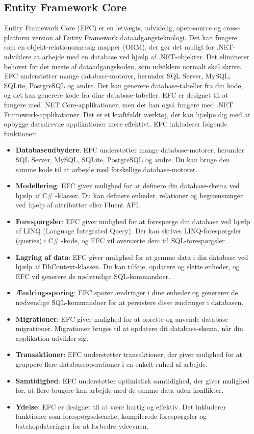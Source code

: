 \subsection{Entity Framework Core}
Entity Framework Core (EFC) er en letvægts, udvidelig, open-source og cross-platform version af Entity Framework dataadgangsteknologi.
Det kan fungere som en objekt-relationsmæssig mapper (ORM), der gør det muligt for .NET-udviklere at arbejde med en database ved hjælp af .NET-objekter.
Det eliminerer behovet for det meste af dataadgangskoden, som udviklere normalt skal skrive. EFC understøtter mange database-motorer, herunder SQL Server, MySQL, SQLite, PostgreSQL og andre.
Det kan generere database-tabeller fra din kode, og det kan generere kode fra dine database-tabeller.
EFC er designet til at fungere med .NET Core-applikationer, men det kan også fungere med .NET Framework-applikationer.
Det er et kraftfuldt værktøj, der kan hjælpe dig med at opbygge datadrevne applikationer mere effektivt. EFC inkluderer følgende funktioner:
\begin{itemize}
    \item \textbf{Databaseudbydere}: EFC understøtter mange database-motorer, herunder SQL Server, MySQL, SQLite, PostgreSQL og andre. Du kan bruge den samme kode til at arbejde med forskellige database-motorer.
    \item \textbf{Modellering}: EFC giver mulighed for at definere din database-skema ved hjælp af C\# -klasser. Du kan definere enheder, relationer og begrænsninger ved hjælp af attributter eller Fluent API.
    \item \textbf{Forespørgsler}: EFC giver mulighed for at forespørge din database ved hjælp af LINQ (Language Integrated Query). Der kan skrives LINQ-forespørgsler (queries) i C\# -kode, og EFC vil oversætte dem til SQL-forespørgsler.
    \item \textbf{Lagring af data}: EFC giver mulighed for at gemme data i din database ved hjælp af DbContext-klassen. Du kan tilføje, opdatere og slette enheder, og EFC vil generere de nødvendige SQL-kommandoer.
    \item \textbf{Ændringssporing}: EFC sporer ændringer i dine enheder og genererer de nødvendige SQL-kommandoer for at persistere disse ændringer i databasen.
    \item \textbf{Migrationer}: EFC giver mulighed for at oprette og anvende database-migrationer. Migrationer bruges til at opdatere dit database-skema, når din applikation udvikler sig.
    \item \textbf{Transaktioner}: EFC understøtter transaktioner, der giver mulighed for at gruppere flere databaseoperationer i en enkelt enhed af arbejde.
    \item \textbf{Samtidighed}: EFC understøtter optimistisk samtidighed, der giver mulighed for, at flere brugere kan arbejde med de samme data uden konflikter.
    \item \textbf{Ydelse}: EFC er designet til at være hurtig og effektiv. Det inkluderer funktioner som forespørgselscache, kompilerede forespørgsler og batchopdateringer for at forbedre ydeevnen.
\end{itemize}

